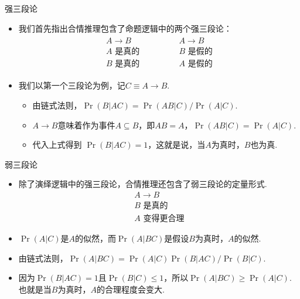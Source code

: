 \begin{frame}{强三段论}
\begin{itemize}
    \item 我们首先指出合情推理包含了命题逻辑中的两个强三段论：
        \[
        \begin{array}{c}
            \begin{array}{c}  
                A \to B \\ A\text{ 是真的} \\ \hline B\text{ 是真的}
            \end{array} 
            \qquad \qquad 
            \begin{array}{c}  
                A \to B \\ B\text{ 是假的} \\ \hline A\text{ 是假的}
            \end{array}
        \end{array} 
    \]
    \item 我们以第一个三段论为例，记$C \equiv A \to B$.
    \begin{itemize}
        \item 由链式法则，$\Pr(B|AC) = \Pr(AB|C) / \Pr(A|C)$.
        \item $A \to B$意味着作为事件$A\subseteq B$，即$AB=A$，$\Pr(AB|C) = \Pr(A|C)$.
        \item 代入上式得到 $\Pr(B|AC) = 1$，这就是说，当$A$为真时，$B$也为真.
    \end{itemize}
\end{itemize}
\end{frame}

\begin{frame}{弱三段论}
\begin{itemize}
    \item 除了演绎逻辑中的强三段论，合情推理还包含了弱三段论的定量形式.
    \[\begin{array}{c}  
            A \to B \\ B\text{ 是真的} \\ \hline A\text{ 变得更合理}
        \end{array}\]
    \item $\Pr(A|C)$是$A$的似然，而$\Pr(A|BC)$是假设$B$为真时，$A$的似然.
    \item 由链式法则，$\Pr(A|BC) = \Pr(A|C)\Pr(B|AC)/\Pr(B|C)$.
    \item 因为$\Pr(B|AC) = 1$且$\Pr(B|C)\leq 1$，所以$\Pr(A|BC) \geq \Pr(A|C)$. 也就是当$B$为真时，$A$的合理程度会变大.
\end{itemize}
\end{frame}


